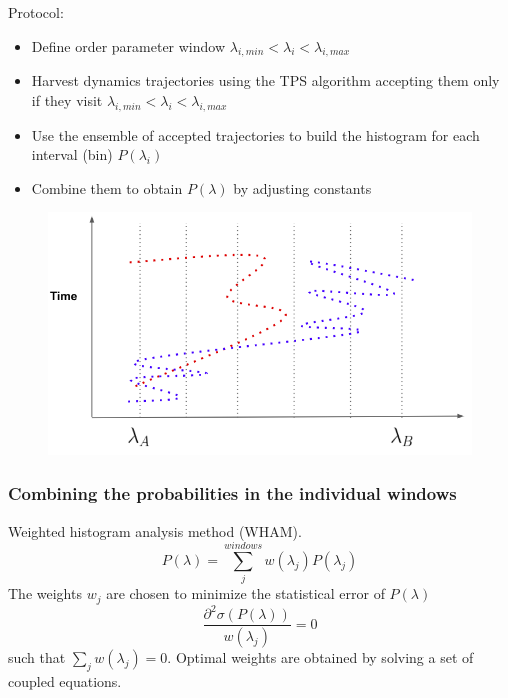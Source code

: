 \documentclass[a4paper,8pt]{beamer}
\begin{document}
\begin{frame}
\frametitle{}
Protocol:
\begin{itemize}
\item Define order parameter window $\lambda_{i,min}<\lambda_i<\lambda_{i,max}$
\item Harvest dynamics trajectories using the TPS algorithm accepting them only if they visit 
 $\lambda_{i,min}<\lambda_i<\lambda_{i,max}$
 \item Use the ensemble of accepted trajectories to build the histogram for each interval (bin) 
 $P(\lambda_i)$
 \item Combine them to obtain $P(\lambda)$ by adjusting constants 
\end{itemize}
\pause
\begin{figure}
\includegraphics[scale=0.3]{bolas_tps_1.png}
\end{figure}
\end{frame}

\begin{frame}
\frametitle{Combining the probabilities in the individual windows}
Weighted histogram analysis method (WHAM).
\begin{equation}
P(\lambda) = \sum^{windows}_j w(\lambda_j)P(\lambda_j) \nonumber 
\end{equation}
The weights $w_j$ are chosen to minimize the statistical error of $P(\lambda)$
\begin{equation}
\frac{\partial^2\sigma(P(\lambda))}{w(\lambda_j)} = 0 \nonumber 
\end{equation}
such that $\sum_jw(\lambda_j)=0$.
Optimal weights are obtained by solving a set of coupled equations. 
\end{frame}
\end{document}
